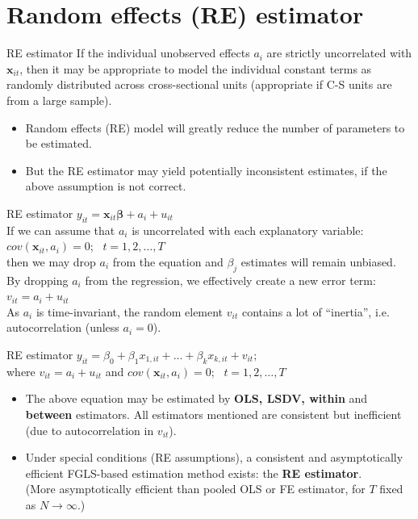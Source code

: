 \documentclass[usenames,dvipsnames]{beamer}
\begin{document}
\section{Random effects (RE) estimator}
\begin{frame}{RE estimator}
If the individual unobserved effects $a_i$ are strictly uncorrelated with $\bm{x}_{it}$, then it may be appropriate to model the individual constant terms as randomly distributed across cross-sectional units (appropriate if C-S units are from a large sample).
\bigskip

\begin{itemize}
\item Random effects (RE) model will greatly reduce the number of parameters to be estimated.
\bigskip
\item But the RE estimator may yield potentially inconsistent estimates, if the above assumption is not correct.
\end{itemize}
\end{frame}
\begin{frame}{RE estimator}
$y_{it} = \bm{x}_{it} \bm{\beta} + a_i + u_{it}$\\
\vspace{0.5cm}
If we can assume that $a_i$ is uncorrelated with each explanatory variable: $\textit{cov}(\bm{x}_{it}, a_i) = 0$; \ $t = 1,2, \dots, T$ \\then we may drop $a_i$ from the equation and $\beta_j$ estimates will remain unbiased.\\
\bigskip
By dropping $a_i$ from the regression, we effectively create a new error term: $v_{it} = a_i + u_{it}$\\
\medskip
As $a_i$ is time-invariant, the random element $v_{it}$ contains a lot of ``inertia'', i.e. autocorrelation (unless $a_i = 0$).
\end{frame}
\begin{frame}{RE estimator}
$y_{it} = \beta_0 + \beta_1 x_{1,it} + \dots + \beta_k x_{k,it} + v_{it};$\\
\bigskip
where $v_{it} = a_i + u_{it}$ and $\textit{cov}(\bm{x}_{it},a_i)=0$; \ $t=1,2, \dots, T$\\
\bigskip
\begin{itemize}
\item The above equation may be estimated by \textbf{OLS, LSDV, within} and \textbf{between} estimators. All estimators mentioned are consistent but inefficient (due to autocorrelation in $v_{it}$).\\
\item Under special conditions (RE assumptions), a consistent and asymptotically efficient FGLS-based estimation method exists: the \textbf{RE estimator}.\\(More asymptotically efficient than pooled OLS or FE estimator, for $T$ fixed as $N \rightarrow \infty$.)
\end{itemize}
\end{frame}
\end{document}
